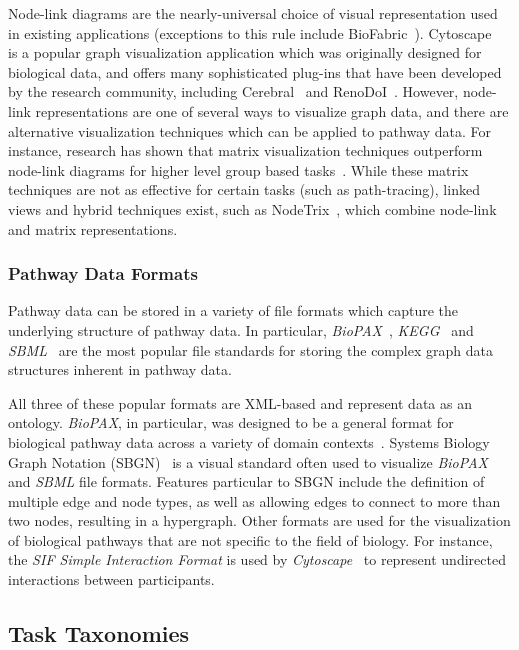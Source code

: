 \documentclass[twocolumn]{bmcart}%
\begin{document}
Node-link diagrams are the nearly-universal choice of visual representation used in existing applications (exceptions to this rule include BioFabric~\cite{Longabaugh2012biofabric}).
Cytoscape~\cite{cytoscape} is a popular graph visualization application which was originally designed for biological data, and offers many sophisticated plug-ins that have been developed by the research community, including Cerebral~\cite{Barsky2008cerebral} and RenoDoI~\cite{Vehlow2015}.
However, node-link representations are one of several ways to visualize graph data, and there are alternative visualization techniques which can be applied to pathway data.
For instance, research has shown that matrix visualization techniques outperform node-link diagrams for higher level group based tasks~\cite{Ghoniem2004,Henry2007}.
While these matrix techniques are not as effective for certain tasks (such as path-tracing), linked views and hybrid techniques exist, such as NodeTrix~\cite{NodeTrix2007}, which combine node-link and matrix representations.

\subsubsection*{Pathway Data Formats}

Pathway data can be stored in a variety of file formats which capture the underlying structure of pathway data.
In particular, \textit{BioPAX}~\cite{demir2010biopax}, \textit{KEGG}~\cite{kanehisa2000kegg} and \textit{SBML}~\cite{Hucka2003} are the most popular file standards for storing the complex graph data structures inherent in pathway data.

All three of these popular formats are XML-based and represent data as an ontology.
\emph{BioPAX}, in particular, was designed to be a general format for biological pathway data across a variety of domain contexts~\cite{demir2010biopax}.
Systems Biology Graph Notation (SBGN)~\cite{Novere2009} is a visual standard often used to visualize \textit{BioPAX} and \textit{SBML} file formats.
Features particular to SBGN include the definition of multiple edge and node types, as well as allowing edges to connect to more than two nodes, resulting in a hypergraph.
Other formats are used for the visualization of biological pathways that are not specific to the field of biology.
For instance, the \textit{SIF Simple Interaction Format} is used by \textit{Cytoscape}~\cite{Shannon2003cytoscape} to represent undirected interactions between participants.

\subsection*{Task Taxonomies}
\end{document}

